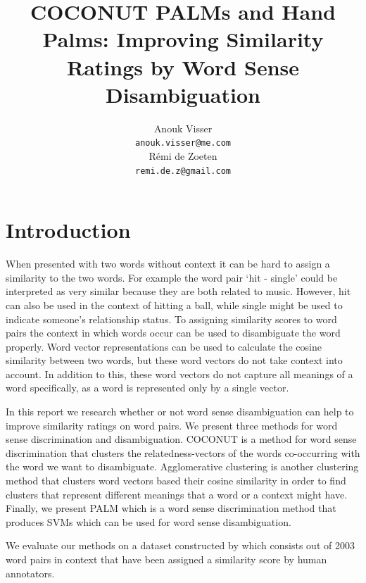 \documentclass[11pt]{article}
\title{COCONUT PALMs and Hand Palms: Improving Similarity Ratings by Word Sense Disambiguation}
\author{Anouk Visser \\
  {\tt anouk.visser@me.com} \\\And
  R\'emi de Zoeten \\
  {\tt remi.de.z@gmail.com} \\}
\date{}
\begin{document}
\maketitle
\begin{abstract}


\end{abstract}

\section{Introduction}
When presented with two words without context it can be hard to assign a similarity to the two words. For example the word pair `hit - single' could be interpreted as very similar because they are both related to music. However, hit can also be used in the context of hitting a ball, while single might be used to indicate someone's relationship status. To assigning similarity scores to word pairs the context in which words occur can be used to disambiguate the word properly. Word vector representations \cite{word2vec} can be used to calculate the cosine similarity between two words, but these word vectors do not take context into account. In addition to this, these word vectors do not capture all meanings of a word specifically, as a word is represented only by a single vector. 

In this report we research whether or not word sense disambiguation can help to improve similarity ratings on word pairs. We present three methods for word sense discrimination and disambiguation. COCONUT is a method for word sense discrimination that clusters the relatedness-vectors of the words co-occurring with the word we want to disambiguate. Agglomerative clustering is another clustering method that clusters word vectors based their cosine similarity in order to find clusters that represent different meanings that a word or a context might have. Finally, we present PALM which is a word sense discrimination method that produces SVMs which can be used for word sense disambiguation. 

We evaluate our methods on a dataset constructed by \cite{global} which consists out of 2003 word pairs in context that have been assigned a similarity score by human annotators.
\end{document}
